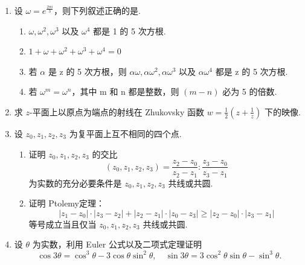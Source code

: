 \documentclass[openany,oneside]{ctexbook}
\begin{document}
\begin{enumerate}
\item  
设 \(\omega = e^{\frac{2\pi i}{3}}\)，则下列叙述正确的是.  

\begin{enumerate}
\item[A.] \(\omega, \omega^2, \omega^3\) 以及 \(\omega^4\) 都是 1 的 5 次方根.
\item[B.] \(1 + \omega + \omega^2 + \omega^3 + \omega^4 = 0\)
\item[C.] 若 \(\alpha\) 是 z 的 5 次方根，则 \(\alpha\omega, \alpha\omega^2, \alpha\omega^3\) 以及 \(\alpha\omega^4\) 都是 z 的 5 次方根.
\item[D.] 若 \(\omega^m = \omega^n\)，其中 m 和 n 都是整数，则 \((m-n)\) 必为 5 的倍数.
\end{enumerate}
\item 求 \( z \)-平面上以原点为端点的射线在 Zhukovsky 函数 \( w = \frac{1}{2} \left( z + \frac{1}{z} \right) \) 下的映像.

\item 设 \( z_0, z_1, z_2, z_3 \) 为复平面上互不相同的四个点.

\begin{enumerate}
\item 证明 \( z_0, z_1, z_2, z_3 \) 的交比  
\[(z_0, z_1, z_2, z_3) = \frac{z_2 - z_0}{z_2 - z_1} : \frac{z_3 - z_0}{z_3 - z_1}\]
为实数的充分必要条件是 \( z_0, z_1, z_2, z_3 \) 共线或共圆.

\item[(2)] 证明 Ptolemy定理：  
\[|z_1 - z_0| \cdot |z_3 - z_2| + |z_2 - z_1| \cdot |z_0 - z_3| \geq |z_2 - z_0| \cdot |z_3 - z_1|\]
等号成立当且仅当 \( z_0, z_1, z_2, z_3 \) 共线或共圆.
\end{enumerate}

\item 设 \(\theta\) 为实数，利用 Euler 公式以及二项式定理证明
\[\cos 3\theta = \cos^3 \theta - 3 \cos \theta \sin^2 \theta, \quad \sin 3\theta = 3 \cos^2 \theta \sin \theta - \sin^3 \theta.\]
\end{enumerate}
\end{document}
